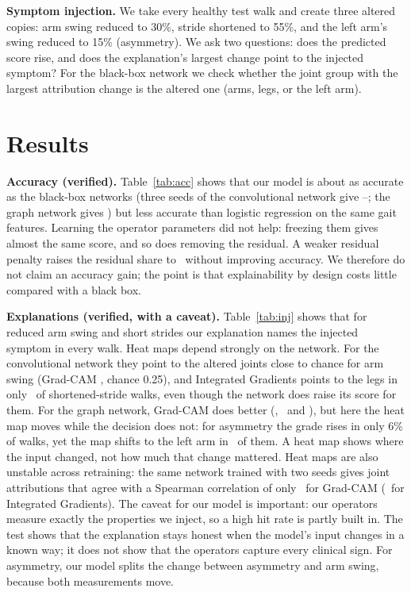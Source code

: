 \documentclass[10pt,twocolumn]{article}
\begin{document}
\textbf{Symptom injection.} We take every healthy test walk and create three altered copies: arm swing reduced
to 30\%, stride shortened to 55\%, and the left arm's swing reduced to 15\% (asymmetry). We ask two questions:
does the predicted score rise, and does the explanation's largest change point to the injected symptom? For the
black-box network we check whether the joint group with the largest attribution change is the altered one
(arms, legs, or the left arm).

\section{Results}



\textbf{Accuracy (verified).} Table~\ref{tab:acc} shows that our model is about as accurate as the black-box
networks (three seeds of the convolutional network give \CNNFoneLo--\CNNFoneHi; the graph network gives \STFone) but
less accurate than logistic regression on the same gait features. Learning the operator
parameters did not help: freezing them gives almost the same score, and so does removing the residual. A weaker
residual penalty raises the residual share to \RhoWeak\ without improving accuracy. We therefore do not claim an
accuracy gain; the point is that explainability by design costs little compared with a black box.

\textbf{Explanations (verified, with a caveat).} Table~\ref{tab:inj} shows that for reduced arm swing and short
strides our explanation names the injected symptom in every walk. Heat maps depend strongly on the network. For the
convolutional network they point to the altered joints close to chance for arm swing (Grad-CAM \GCArm, chance 0.25),
and Integrated Gradients points to the legs in only \IGStride\ of shortened-stride walks, even though the network does
raise its score for them. For the graph network, Grad-CAM does better (\STGcArm, \STGcStride\ and \STGcAsym), but
here the heat map moves while the decision does not: for asymmetry the grade rises in only 6\% of walks, yet the map
shifts to the left arm in \STGcAsym\ of them. A heat map shows where the input changed, not how much that change
mattered. Heat maps are also unstable across retraining: the same network trained with two seeds gives joint
attributions that agree with a Spearman correlation of only \SeedGC\ for Grad-CAM (\SeedIG\ for Integrated
Gradients). The caveat for our model is important: our operators measure exactly the properties we
inject, so a high hit rate is partly built in. The test shows that the explanation stays honest when the model's
input changes in a known way; it does not show that the operators capture every clinical sign. For asymmetry,
our model splits the change between asymmetry and arm swing, because both measurements move.
\end{document}
